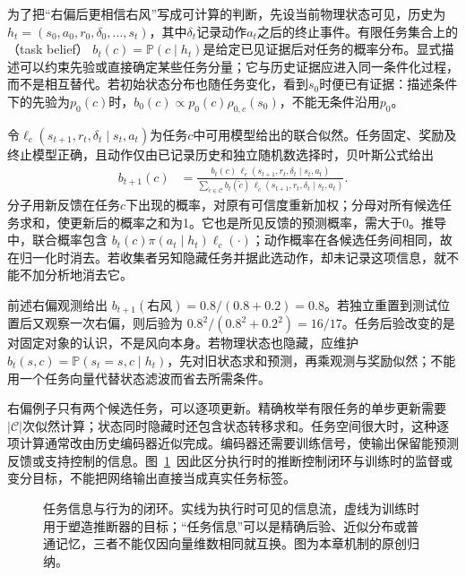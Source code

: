 为了把“右偏后更相信右风”写成可计算的判断，先设当前物理状态可见，历史为
$h_t=(s_0,a_0,r_0,\delta_0,\ldots,s_t)$，其中$\delta_t$记录动作$a_t$之后的终止事件。有限任务集合上的（task belief）
$b_t(c)=\mathbb P(c\mid h_t)$是给定已见证据后对任务的概率分布。显式描述可以约束先验或直接确定某些任务分量；它与历史证据应进入同一条件化过程，而不是相互替代。若初始状态分布也随任务变化，看到$s_0$时便已有证据：描述条件下的先验为$p_0(c)$时，$b_0(c)\propto p_0(c)\rho_{0,c}(s_0)$，不能无条件沿用$p_0$。

令$\ell_c(s_{t+1},r_t,\delta_t\mid s_t,a_t)$为任务$c$中可用模型给出的联合似然。任务固定、奖励及终止模型正确，且动作仅由已记录历史和独立随机数选择时，贝叶斯公式给出
\begin{align}
 b_{t+1}(c)
 &=\frac{b_t(c)\,
     \ell_c(s_{t+1},r_t,\delta_t\mid s_t,a_t)}
 {\sum_{\widetilde c\in\mathcal C}b_t(\widetilde c)\,
     \ell_{\widetilde c}(s_{t+1},r_t,\delta_t\mid s_t,a_t)}.
 \label{eq:rl-transfer-belief-update}
\end{align}
分子用新反馈在任务$c$下出现的概率，对原有可信度重新加权；分母对所有候选任务求和，使更新后的概率之和为1。它也是所见反馈的预测概率，需大于0。推导中，联合概率包含
$b_t(c)\pi(a_t\mid h_t)\ell_c(\cdot)$；动作概率在各候选任务间相同，故在归一化时消去。若收集者另知隐藏任务并据此选动作，却未记录这项信息，就不能不加分析地消去它。

前述右偏观测给出
$b_{t+1}(\text{右风})=0.8/(0.8+0.2)=0.8$。若独立重置到测试位置后又观察一次右偏，则后验为
$0.8^2/(0.8^2+0.2^2)=16/17$。任务后验改变的是对固定对象的认识，不是风向本身。若物理状态也隐藏，应维护
$b_t(s,c)=\mathbb P(s_t=s,c\mid h_t)$，先对旧状态求和预测，再乘观测与奖励似然；不能用一个任务向量代替状态滤波而省去所需条件。

右偏例子只有两个候选任务，可以逐项更新。精确枚举有限任务的单步更新需要$|\mathcal C|$次似然计算；状态同时隐藏时还包含状态转移求和。任务空间很大时，这种逐项计算通常改由历史编码器近似完成。编码器还需要训练信号，使输出保留能预测反馈或支持控制的信息。图~\ref{fig:rl-transfer-belief-loop}~因此区分执行时的推断控制闭环与训练时的监督或变分目标，不能把网络输出直接当成真实任务标签。

\begin{figure}[htbp]
 \centering
 
 \caption{任务信息与行为的闭环。实线为执行时可见的信息流，虚线为训练时用于塑造推断器的目标；“任务信息”可以是精确后验、近似分布或普通记忆，三者不能仅因向量维数相同就互换。图为本章机制的原创归纳。}
 \label{fig:rl-transfer-belief-loop}
\end{figure}

